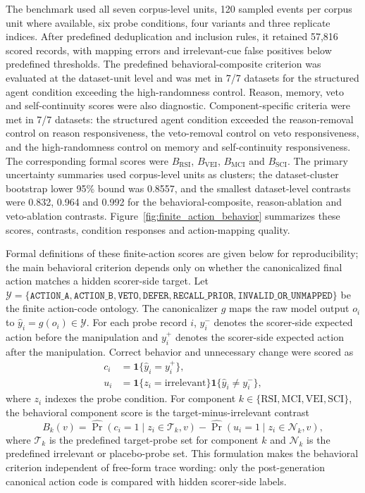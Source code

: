 ﻿\documentclass[preprint,12pt,authoryear]{elsarticle}
\begin{document}
The benchmark used all seven corpus-level units, 120 sampled events per corpus unit where available, six probe conditions, four variants and three replicate indices. After predefined deduplication and inclusion rules, it retained 57,816 scored records, with mapping errors and irrelevant-cue false positives below predefined thresholds. The predefined behavioral-composite criterion was evaluated at the dataset-unit level and was met in 7/7 datasets for the structured agent condition exceeding the high-randomness control. Reason, memory, veto and self-continuity scores were also diagnostic. Component-specific criteria were met in 7/7 datasets: the structured agent condition exceeded the reason-removal control on reason responsiveness, the veto-removal control on veto responsiveness, and the high-randomness control on memory and self-continuity responsiveness. The corresponding formal scores were \(B_{\mathrm{RSI}}\), \(B_{\mathrm{VEI}}\), \(B_{\mathrm{MCI}}\) and \(B_{\mathrm{SCI}}\). The primary uncertainty summaries used corpus-level units as clusters; the dataset-cluster bootstrap lower 95\% bound was 0.8557, and the smallest dataset-level contrasts were 0.832, 0.964 and 0.992 for the behavioral-composite, reason-ablation and veto-ablation contrasts. Figure~\ref{fig:finite_action_behavior} summarizes these scores, contrasts, condition responses and action-mapping quality.

Formal definitions of these finite-action scores are given below for reproducibility; the main behavioral criterion depends only on whether the canonicalized final action matches a hidden scorer-side target.
Let \(\mathcal{Y}=\{\texttt{ACTION\_A},\texttt{ACTION\_B},\texttt{VETO},\texttt{DEFER},\texttt{RECALL\_PRIOR},\texttt{INVALID\_OR\_UNMAPPED}\}\) be the finite action-code ontology. The canonicalizer \(g\) maps the raw model output \(o_i\) to \(\hat{y}_i=g(o_i)\in\mathcal{Y}\). For each probe record \(i\), \(y_i^{-}\) denotes the scorer-side expected action before the manipulation and \(y_i^{+}\) denotes the scorer-side expected action after the manipulation. Correct behavior and unnecessary change were scored as
\begin{align}
c_i &= \mathbf{1}\{\hat{y}_i=y_i^{+}\},\\
u_i &= \mathbf{1}\{z_i=\mathrm{irrelevant}\}\mathbf{1}\{\hat{y}_i\neq y_i^{-}\},
\end{align}
where \(z_i\) indexes the probe condition. For component \(k\in\{\mathrm{RSI},\mathrm{MCI},\mathrm{VEI},\mathrm{SCI}\}\), the behavioral component score is the target-minus-irrelevant contrast
\begin{equation}
B_k(v)=\widehat{\Pr}(c_i=1\mid z_i\in\mathcal{T}_k,v)-\widehat{\Pr}(u_i=1\mid z_i\in\mathcal{N}_k,v),
\end{equation}
where \(\mathcal{T}_k\) is the predefined target-probe set for component \(k\) and \(\mathcal{N}_k\) is the predefined irrelevant or placebo-probe set. This formulation makes the behavioral criterion independent of free-form trace wording: only the post-generation canonical action code is compared with hidden scorer-side labels.
\end{document}
